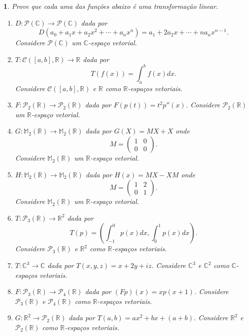 \documentclass[12pt]{exam}
\newtheorem{exercicio}{}
\newcommand{\real}{\mathbb{R}}
\newcommand{\complex}{\mathbb{C}}
\newcommand{\cp}[1]{\mathbb{#1}}
\begin{document}
\begin{exercicio}
  Prove que cada uma das fun\c{c}\~oes abaixo \'e uma transforma\c{c}\~ao linear.
  \begin{enumerate}[label=({\alph*})]
    \item $D : \mathcal{P}(\complex) \to \mathcal{P}(\complex)$ dada por
    \[
      D(a_0 + a_1x + a_2x^2 + \cdots + a_nx^n) = a_1 + 2a_2x + \cdots + na_nx^{n - 1}.
    \]
    Considere $\mathcal{P}(\complex)$ um $\complex$-espa\c{c}o vetorial.
    \item $T : \mathcal{C}([a,b], \real) \to \real$ dada por
    \[
      T(f(x)) = \int_a^bf(x)dx.
    \]
    Considere $\mathcal{C}([a,b], \real)$ e $\real$ como $\real$-espa\c{c}os vetoriais.
    \item $F : \mathcal{P}_2(\real) \to \mathcal{P}_2(\real)$ dada por $F(p(t)) = t^2p''(x)$. Considere $\mathcal{P}_2(\real)$ um $\real$-espa\c{c}o vetorial.
    \item $G : \cp{M}_2(\real) \to \cp{M}_2(\real)$ dada por $G(X) = MX + X$ onde
    \[
      M = \begin{pmatrix}
        1 & 0\\
        0 & 0
      \end{pmatrix}.
    \]
    Considere $\cp{M}_2(\real)$ um $\real$-espa\c{c}o vetorial.
    \item $H : \cp{M}_2(\real) \to \cp{M}_2(\real)$ dada por $H(x) = MX - XM$ onde
    \[
      M = \begin{pmatrix}
        1 & 2\\
        0 & 1
      \end{pmatrix}.
    \]
    Considere $\cp{M}_2(\real)$ um $\real$-espa\c{c}o vetorial.
    \item $T : \mathcal{P}_3(\real) \to \real^2$ dada por
    \[
      T(p) = \left(\int_{-1}^0p(x)dx, \int_0^1p(x)dx\right).
    \]
    Considere $\mathcal{P}_3(\real)$ e $\real^2$ como $\real$-espa\c{c}os vetoriais.
    \item $T : \complex^3 \to \complex$ dada por $T(x,y,z) = x + 2y + iz$. Considere $\complex^3$ e $\complex^2$ como $\complex$-espa\c{c}os vetoriais.
    \item $F : \mathcal{P}_3(\real) \to \mathcal{P}_4(\real)$ dada por $(Fp)(x) = xp(x + 1)$. Considere $\mathcal{P}_3(\real)$ e $\mathcal{P}_4(\real)$ como $\real$-espa\c{c}os vetoriais.
    \item $G : \real^2 \to \mathcal{P}_2(\real)$ dada por $T(a,b) = ax^2 + bx + (a + b)$. Considere $\real^2$ e $\mathcal{P}_2(\real)$ como $\real$-espa\c{c}os vetoriais.
   \end{enumerate}
\end{exercicio}
\end{document}
